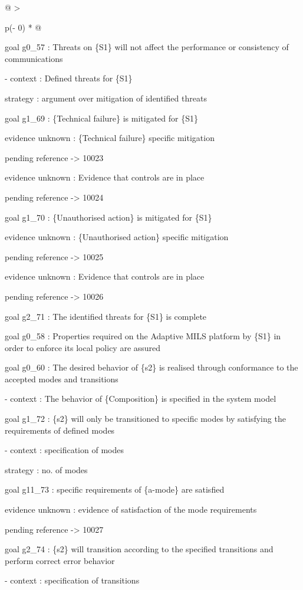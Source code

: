 \documentclass[12pt,twoside,a4paper]{article}
\begin{document}
\begin{longtable}[]{@{}
  >{\raggedright\arraybackslash}p{(\columnwidth - 0\tabcolsep) * }@{}}
\begin{minipage}[b]{\linewidth}
goal g0\_57 : Threats on \{S1\} will not affect the performance or consistency of communications

- context : Defined threats for \{S1\}

strategy : argument over mitigation of identified threats

goal g1\_69 : \{Technical failure\} is mitigated for \{S1\}

evidence unknown : \{Technical failure\} specific mitigation

pending reference -\textgreater{} 10023

evidence unknown : Evidence that controls are in place

pending reference -\textgreater{} 10024

goal g1\_70 : \{Unauthorised action\} is mitigated for \{S1\}

evidence unknown : \{Unauthorised action\} specific mitigation

pending reference -\textgreater{} 10025

evidence unknown : Evidence that controls are in place

pending reference -\textgreater{} 10026

goal g2\_71 : The identified threats for \{S1\} is complete

goal g0\_58 : Properties required on the Adaptive MILS platform by \{S1\} in order to enforce its local policy are assured

goal g0\_60 : The desired behavior of \{s2\} is realised through conformance to the accepted modes and transitions

- context : The behavior of \{Composition\} is specified in the system model

goal g1\_72 : \{s2\} will only be transitioned to specific modes by satisfying the requirements of defined modes

- context : specification of modes

strategy : no. of modes

goal g11\_73 : specific requirements of \{a-mode\} are satisfied

evidence unknown : evidence of satisfaction of the mode requirements

pending reference -\textgreater{} 10027

goal g2\_74 : \{s2\} will transition according to the specified transitions and perform correct error behavior

- context : specification of transitions


\end{minipage}
\end{longtable}
\end{document}
